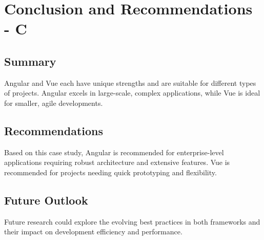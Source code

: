 \chapter{Conclusion and Recommendations - C}%

\section{Summary}
Angular and Vue each have unique strengths and are suitable for different types of projects. Angular excels in large-scale, complex applications, while Vue is ideal for smaller, agile developments.
\section{Recommendations}
Based on this case study, Angular is recommended for enterprise-level applications requiring robust architecture and extensive features. Vue is recommended for projects needing quick prototyping and flexibility.
\section{Future Outlook}
Future research could explore the evolving best practices in both frameworks and their impact on development efficiency and performance.

